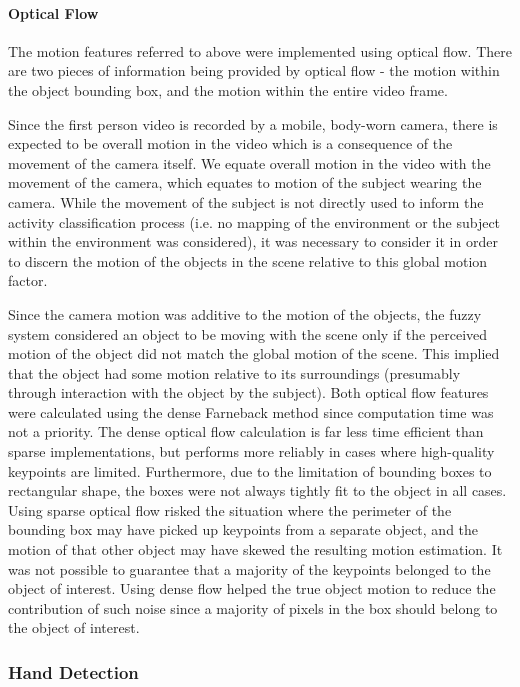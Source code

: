 \documentclass[12pt]{report}
\begin{document}
\paragraph{Optical Flow}
The motion features referred to above were implemented using optical flow. There are two pieces of information being provided by optical flow - the motion within the object bounding box, and the motion within the entire video frame.

Since the first person video is recorded by a mobile, body-worn camera, there is expected to be overall motion in the video which is a consequence of the movement of the camera itself. We equate overall motion in the video with the movement of the camera, which equates to motion of the subject wearing the camera. While the movement of the subject is not directly used to inform the activity classification process (i.e. no mapping of the environment or the subject within the environment was considered), it was necessary to consider it in order to discern the motion of the objects in the scene relative to this global motion factor.

Since the camera motion was additive to the motion of the objects, the fuzzy system considered an object to be moving with the scene only if the perceived motion of the object did not match the global motion of the scene. This implied that the object had some motion relative to its surroundings (presumably through interaction with the object by the subject). Both optical flow features were calculated using the dense Farneback method \cite{Farneback2003Two-FrameOn} since computation time was not a priority. The dense optical flow calculation is far less time efficient than sparse implementations, but performs more reliably in cases where high-quality keypoints are limited. Furthermore, due to the limitation of bounding boxes to rectangular shape, the boxes were not always tightly fit to the object in all cases. Using sparse optical flow risked the situation where the perimeter of the bounding box may have picked up keypoints from a separate object, and the motion of that other object may have skewed the resulting motion estimation. It was not possible to guarantee that a majority of the keypoints belonged to the object of interest. Using dense flow helped the true object motion to reduce the contribution of such noise since a majority of pixels in the box should belong to the object of interest.

\subsubsection{Hand Detection}
\end{document}
